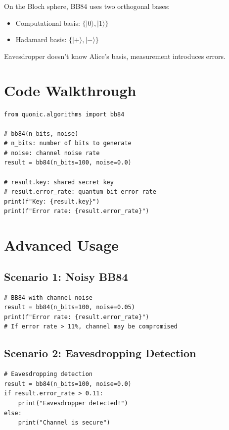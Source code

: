 \documentclass[12pt,a4paper]{article}
\begin{document}
On the Bloch sphere, BB84 uses two orthogonal bases:
\begin{itemize}
  \item Computational basis: $\{|0\rangle, |1\rangle\}$
  \item Hadamard basis: $\{|+\rangle, |-\rangle\}$
\end{itemize}

Eavesdropper doesn't know Alice's basis, measurement introduces errors.

\section{Code Walkthrough}

\begin{verbatim}
from quonic.algorithms import bb84

# bb84(n_bits, noise)
# n_bits: number of bits to generate
# noise: channel noise rate
result = bb84(n_bits=100, noise=0.0)

# result.key: shared secret key
# result.error_rate: quantum bit error rate
print(f"Key: {result.key}")
print(f"Error rate: {result.error_rate}")
\end{verbatim}

\section{Advanced Usage}

\subsection{Scenario 1: Noisy BB84}

\begin{verbatim}
# BB84 with channel noise
result = bb84(n_bits=100, noise=0.05)
print(f"Error rate: {result.error_rate}")
# If error rate > 11%, channel may be compromised
\end{verbatim}

\subsection{Scenario 2: Eavesdropping Detection}

\begin{verbatim}
# Eavesdropping detection
result = bb84(n_bits=100, noise=0.0)
if result.error_rate > 0.11:
    print("Eavesdropper detected!")
else:
    print("Channel is secure")
\end{verbatim}
\end{document}
